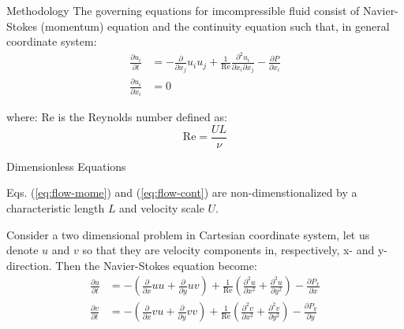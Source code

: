 \documentclass{beamer}
\newcommand{\ren}{ \text{Re} }
\begin{document}
\begin{frame}{Methodology}
	The governing equations for imcompressible fluid consist of Navier-Stokes (momentum) equation and the continuity equation such that, in general coordinate system: \begin{align}
		\frac{\partial u_i}{\partial t} &= -\frac{\partial }{\partial x_j} u_i u_j + \frac{1}{\ren} \frac{\partial^2 u_i}{\partial x_i \partial x_j} - \frac{\partial P}{\partial x_i} \label{eq:flow-mome} \\
		\frac{\partial u_i}{\partial x_i} &= 0 \label{eq:flow-cont}
	\end{align}
	
	where: $\text{Re}$ is the Reynolds number defined as:
	\begin{equation}
		\text{Re} = \frac{UL}{\nu}
	\end{equation}
	
	\begin{block}{Dimensionless Equations}
		\begin{center}
			Eqs. (\ref{eq:flow-mome}) and (\ref{eq:flow-cont}) are non-dimenstionalized by a characteristic length $L$ and velocity scale $U$.
		\end{center}
	\end{block}
	
	\framebreak
	
	Consider a two dimensional problem in Cartesian coordinate system, let us denote $u$ and $v$ so that they are velocity components in, respectively, x- and y-direction. Then the Navier-Stokes equation become: \begin{align}
		\frac{\partial u}{\partial t} &= - \left( \frac{\partial }{\partial x} u u + \frac{\partial }{\partial y} u v \right) + \frac{1}{\ren} \left( \frac{\partial^2 u}{\partial x^2} + \frac{\partial^2 u}{\partial y^2} \right) - \frac{\partial P_x}{\partial x} \\
		\frac{\partial v}{\partial t} &= - \left( \frac{\partial }{\partial x} v u + \frac{\partial }{\partial y} v v \right) + \frac{1}{\ren} \left( \frac{\partial^2 v}{\partial x^2} + \frac{\partial^2 v}{\partial y^2} \right) - \frac{\partial P_y}{\partial y}
	\end{align}
	

\end{frame}
\end{document}
